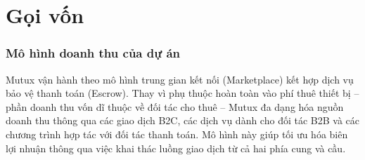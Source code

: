 \part{Gọi vốn}
\section{Mô hình doanh thu của dự án}
Mutux vận hành theo mô hình trung gian kết nối (Marketplace) kết hợp dịch vụ bảo vệ thanh toán (Escrow). Thay vì phụ thuộc hoàn toàn vào phí thuê thiết bị – phần doanh thu vốn dĩ thuộc về đối tác cho thuê – Mutux đa dạng hóa nguồn doanh thu thông qua các giao dịch B2C, các dịch vụ dành cho đối tác B2B và các chương trình hợp tác với đối tác thanh toán. Mô hình này giúp tối ưu hóa biên lợi nhuận thông qua việc khai thác luồng giao dịch từ cả hai phía cung và cầu.
